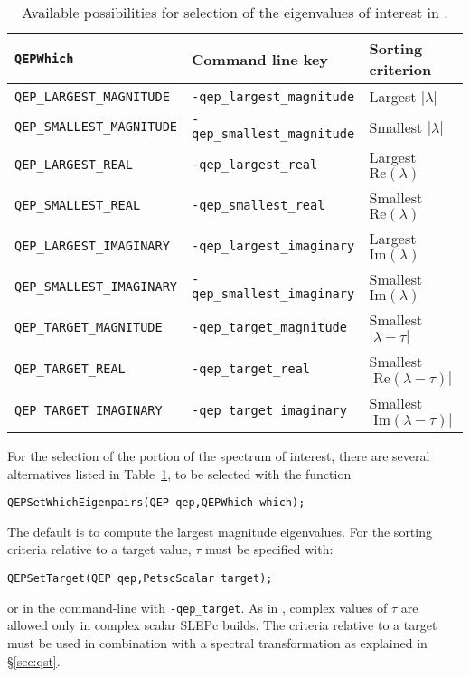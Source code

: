 \begin{table}
\centering
{\small \begin{tabular}{lll}
\texttt{QEPWhich}                  & Command line key                   & Sorting criterion \\\hline
\texttt{QEP\_LARGEST\_MAGNITUDE}   & \texttt{-qep\_largest\_magnitude}  & Largest $|\lambda|$ \\
\texttt{QEP\_SMALLEST\_MAGNITUDE}  & \texttt{-qep\_smallest\_magnitude} & Smallest $|\lambda|$ \\
\texttt{QEP\_LARGEST\_REAL}        & \texttt{-qep\_largest\_real}       & Largest $\mathrm{Re}(\lambda)$ \\
\texttt{QEP\_SMALLEST\_REAL}       & \texttt{-qep\_smallest\_real}      & Smallest $\mathrm{Re}(\lambda)$ \\
\texttt{QEP\_LARGEST\_IMAGINARY}   & \texttt{-qep\_largest\_imaginary}  & Largest $\mathrm{Im}(\lambda)$\footnotemark \\
\texttt{QEP\_SMALLEST\_IMAGINARY}  & \texttt{-qep\_smallest\_imaginary} & Smallest $\mathrm{Im}(\lambda)$\addtocounter{footnote}{-1}\footnotemark \\\hline
\texttt{QEP\_TARGET\_MAGNITUDE}    & \texttt{-qep\_target\_magnitude}   & Smallest $|\lambda-\tau|$ \\
\texttt{QEP\_TARGET\_REAL}         & \texttt{-qep\_target\_real}        & Smallest $|\mathrm{Re}(\lambda-\tau)|$ \\
\texttt{QEP\_TARGET\_IMAGINARY}    & \texttt{-qep\_target\_imaginary}   & Smallest $|\mathrm{Im}(\lambda-\tau)|$ \\\hline
\end{tabular} }
\caption{\label{tab:portionq}Available possibilities for selection of the eigenvalues of interest in .}
\end{table}


	For the selection of the portion of the spectrum of interest, there are several alternatives listed in Table~\ref{tab:portionq}, to be selected with the function
	\begin{Verbatim}[fontsize=\small]
	QEPSetWhichEigenpairs(QEP qep,QEPWhich which);
	\end{Verbatim}
The default is to compute the largest magnitude eigenvalues.
For the sorting criteria relative to a target value, $\tau$ must be specified with:
	\begin{Verbatim}[fontsize=\small]
	QEPSetTarget(QEP qep,PetscScalar target);
	\end{Verbatim}
or in the command-line with \Verb!-qep_target!. As in , complex values of $\tau$ are allowed only in complex scalar SLEPc builds. The criteria relative to a target must be used in combination with a spectral transformation as explained in \S\ref{sec:qst}.


